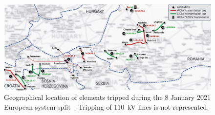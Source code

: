 \begin{figure}
    \centering
    \includegraphics[width = \textwidth]{Figs/SystemSplitTimeline2021.pdf}
    \caption{Geographical location of elements tripped during the 8 January 2021 European system split~\cite{ENTSOESplitJan2021}. Tripping of 110~kV lines is not represented.}
    \label{fig:split2021_timeline}
\end{figure}

